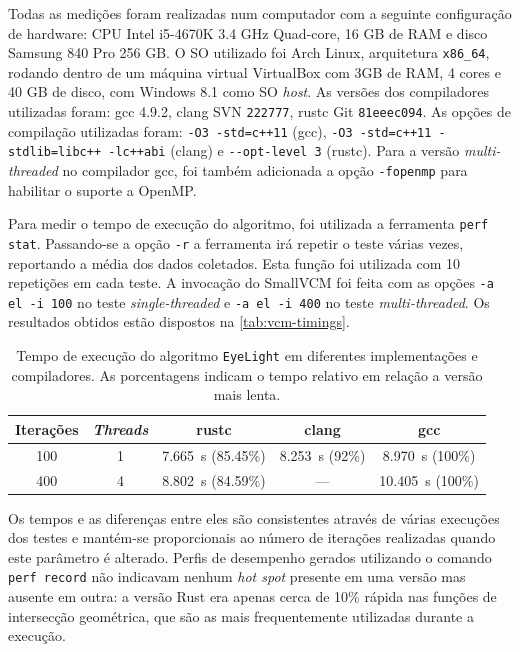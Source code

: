 \documentclass[tg]{mdtufsm}
\begin{document}
Todas as medições foram realizadas num computador com a seguinte configuração de hardware: CPU Intel i5-4670K 3.4 GHz Quad-core, 16 GB de RAM e disco Samsung 840 Pro 256 GB. O SO utilizado foi Arch Linux, arquitetura \texttt{x86\_64}, rodando dentro de um máquina virtual VirtualBox com 3GB de RAM, 4 cores e 40 GB de disco, com Windows 8.1 como SO \emph{host}. As versões dos compiladores utilizadas foram: gcc 4.9.2, clang SVN \texttt{222777}, rustc Git \texttt{81eeec094}. As opções de compilação utilizadas foram: \texttt{-O3 -std=c++11} (gcc), \texttt{-O3 -std=c++11 -stdlib=libc++ -lc++abi} (clang) e \texttt{-{}-opt-level 3} (rustc). Para a versão \emph{multi-threaded} no compilador gcc, foi também adicionada a opção \texttt{-fopenmp} para habilitar o suporte a OpenMP.

Para medir o tempo de execução do algoritmo, foi utilizada a ferramenta \texttt{perf stat}. Passando-se a opção \texttt{-r} a ferramenta irá repetir o teste várias vezes, reportando a média dos dados coletados. Esta função foi utilizada com 10 repetições em cada teste. A invocação do SmallVCM foi feita com as opções \texttt{-a el -i 100} no teste \emph{single-threaded} e \texttt{-a el -i 400} no teste \emph{multi-threaded}. Os resultados obtidos estão dispostos na \autoref{tab:vcm-timings}.

\begin{table}
	\centering
	\begin{tabular}{|c|c|c|c|c|} \hline
	Iterações & \emph{Threads} & rustc & clang & gcc \\ \hline
	100 & 1 & \SI{7.665}{\s} (85.45\%) & \SI{8.253}{\s} (92\%) & \SI{ 8.970}{\s} (100\%) \\
	400 & 4 & \SI{8.802}{\s} (84.59\%) & ---                   & \SI{10.405}{\s} (100\%) \\ \hline
	\end{tabular}
	\caption[Tempo de execução do algoritmo \texttt{EyeLight} em diferentes implementações e compiladores.]{
		Tempo de execução do algoritmo \texttt{EyeLight} em diferentes implementações e compiladores. As porcentagens indicam o tempo relativo em relação a versão mais lenta.
	}
	\label{tab:vcm-timings}
\end{table}

Os tempos e as diferenças entre eles são consistentes através de várias execuções dos testes e mantém-se proporcionais ao número de iterações realizadas quando este parâmetro é alterado. Perfis de desempenho gerados utilizando o comando \texttt{perf record} não indicavam nenhum \emph{hot spot} presente em uma versão mas ausente em outra: a versão Rust era apenas cerca de 10\% rápida nas funções de intersecção geométrica, que são as mais frequentemente utilizadas durante a execução.
\end{document}
